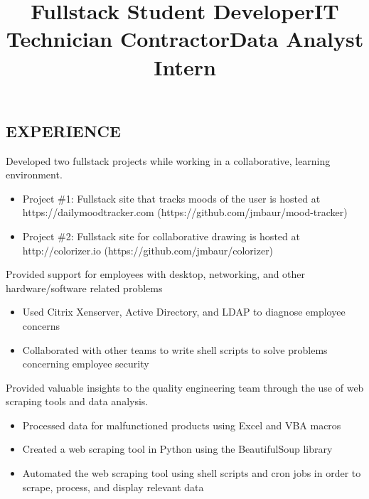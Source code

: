 \documentclass[margin]{res}
\begin{document}
\begin{resume}
\section{EXPERIENCE}

\title{\textbf{Fullstack Student Developer}}
\begin{position}
	Developed two fullstack projects while working in a collaborative, learning environment.
	\begin{itemize}
		\item Project \#1: Fullstack site that tracks moods of the user is hosted at\\https://dailymoodtracker.com (https://github.com/jmbaur/mood-tracker)
		\item Project \#2: Fullstack site for collaborative drawing is hosted at\\http://colorizer.io (https://github.com/jmbaur/colorizer)
	\end{itemize}
\end{position}

\title{\textbf{IT Technician} Contractor}
\begin{position}
	Provided support for employees with desktop, networking, and other hardware/software related problems
	\begin{itemize}
		\item Used Citrix Xenserver, Active Directory, and LDAP to diagnose employee concerns
		\item Collaborated with other teams to write shell scripts to solve problems concerning employee security
	\end{itemize}
\end{position}

\title{\textbf{Data Analyst} Intern}
\begin{position}
	Provided valuable insights to the quality engineering team through the use of web scraping tools and data analysis.
	\begin{itemize}
		\item Processed data for malfunctioned products using Excel and VBA macros
		\item Created a web scraping tool in Python using the BeautifulSoup library
		\item Automated the web scraping tool using shell scripts and cron jobs in order to scrape, process, and display relevant data
	\end{itemize}
\end{position}


\end{resume}
\end{document}
